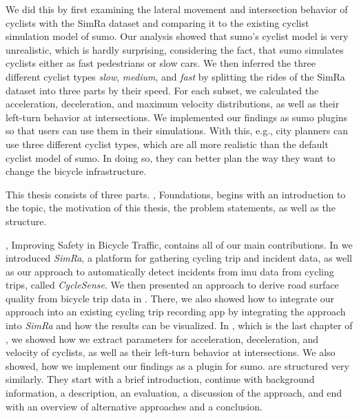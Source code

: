 \begin{itemize}
We did this by first examining the lateral movement and intersection behavior of cyclists with the SimRa dataset and comparing it to the existing cyclist simulation model of \ac{sumo}. 
Our analysis showed that \ac{sumo}'s cyclist model is very unrealistic, which is hardly surprising, considering the fact, that \ac{sumo} simulates cyclists either as fast pedestrians or slow cars.
We then inferred the three different cyclist types \textit{slow}, \textit{medium}, and \textit{fast} by splitting  the rides of the SimRa dataset into three parts by their speed.
For each subset, we calculated the acceleration, deceleration, and maximum velocity distributions, as well as their left-turn behavior at intersections.
We implemented our findings as \ac{sumo} plugins so that users can use them in their simulations.
With this, e.g., city planners can use three different cyclist types, which are all more realistic than the default cyclist model of \ac{sumo}.
In doing so, they can better plan the way they want to change the bicycle infrastructure. 
\end{itemize}

This thesis consists of three parts. , Foundations, begins with an introduction to the topic, the motivation of this thesis, the problem statements, as well as the structure.

, Improving Safety in Bicycle Traffic, contains all of our main contributions.
In  we introduced \textit{SimRa}, a platform for gathering cycling trip and incident data, as well as our approach to automatically detect incidents from \ac{imu} data from cycling trips, called \textit{CycleSense}.
We then presented an approach to derive road surface quality from bicycle trip data in .
There, we also showed how to integrate our approach into an existing cycling trip recording app by integrating the approach into \textit{SimRa} and how the results can be visualized.
In , which is the last chapter of , we showed how we extract parameters for acceleration, deceleration, and velocity of cyclists, as well as their left-turn behavior at intersections.
We also showed, how we implement our findings as a plugin for \ac{sumo}.
 are structured very similarly.
They start with a brief introduction, continue with background information, a description, an evaluation, a discussion of the approach, and end with an overview of alternative approaches and a conclusion.

